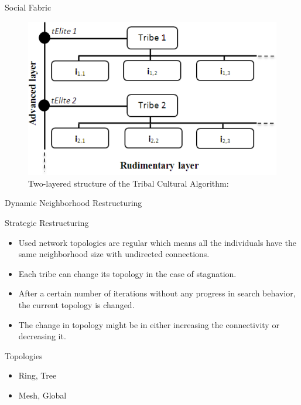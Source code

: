 \documentclass[table]{beamer}
\begin{document}
	\begin{frame}{Social Fabric}
		\begin{figure}[v]
			\includegraphics[scale=0.36]{twolayer}
			\centering
			\caption{Two-layered structure of the Tribal Cultural Algorithm: \cite{ali2012socio}}
			\label{ref:twolayer}
		\end{figure}		
	\end{frame}
	
	\begin{frame}{Dynamic Neighborhood Restructuring}
		\begin{block}{Strategic Restructuring}
			\begin{itemize}{}
				\item Used network topologies are regular which means all the individuals have the same neighborhood size with undirected connections.
				\item Each tribe can change its topology in the case of stagnation. 
				\item After a certain number of iterations without any progress in search behavior, the current topology is changed.
				\item The change in topology might be in either increasing the connectivity or decreasing it. %
			\end{itemize}
		\end{block}
		\begin{block}{Topologies}
			\begin{itemize}
				\item Ring, Tree
				\item Mesh, Global
			\end{itemize}
		\end{block}
	\end{frame}
	
\end{document}
